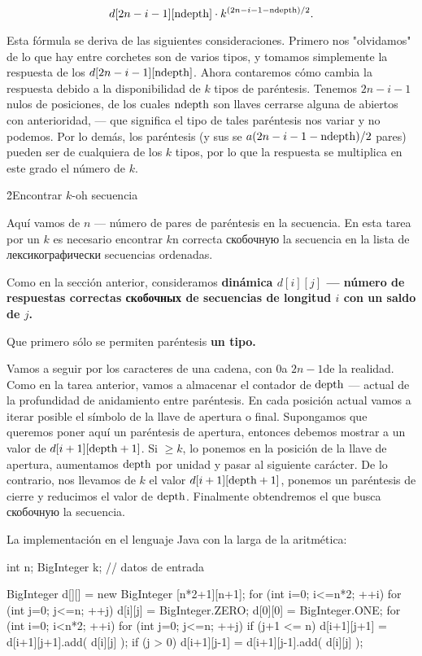 $$ d[2n-i-1][{\rm ndepth}] \cdot k^{ (2n-i-1 - {\rm ndepth})/2 }. $$

Esta fórmula se deriva de las siguientes consideraciones. Primero nos "olvidamos" de lo que hay entre corchetes son de varios tipos, y tomamos simplemente la respuesta de los $d[2n-i-1][{\rm ndepth}]$. Ahora contaremos cómo cambia la respuesta debido a la disponibilidad de $k$ tipos de paréntesis. Tenemos $2n-i-1$ nulos de posiciones, de los cuales $\rm ndepth$ son llaves cerrarse alguna de abiertos con anterioridad, --- que significa el tipo de tales paréntesis nos variar y no podemos. Por lo demás, los paréntesis (y sus se $a(2n-i-1 - {\rm ndepth})/2$ pares) pueden ser de cualquiera de los $k$ tipos, por lo que la respuesta se multiplica en este grado el número de $k$.


\h2{Encontrar $k$-oh secuencia}

Aquí vamos de $n$ --- número de pares de paréntesis en la secuencia. En esta tarea por un $k$ es necesario encontrar $k$n correcta скобочную la secuencia en la lista de лексикографически secuencias ordenadas.

Como en la sección anterior, consideramos \bf{dinámica} $d[i][j]$ --- número de respuestas correctas скобочных de secuencias de longitud $i$ con un saldo de $j$.

Que primero sólo se permiten paréntesis \bf{un} tipo.

Vamos a seguir por los caracteres de una cadena, con $0$a $2n-1$de la realidad. Como en la tarea anterior, vamos a almacenar el contador de $\rm depth$ --- actual de la profundidad de anidamiento entre paréntesis. En cada posición actual vamos a iterar posible el símbolo de la llave de apertura o final. Supongamos que queremos poner aquí un paréntesis de apertura, entonces debemos mostrar a un valor de $d[i+1][\rm depth+1]$. Si $\ge k$, lo ponemos en la posición de la llave de apertura, aumentamos $\rm depth$ por unidad y pasar al siguiente carácter. De lo contrario, nos llevamos de $k$ el valor $d[i+1][\rm depth+1]$, ponemos un paréntesis de cierre y reducimos el valor de $\rm depth$. Finalmente obtendremos el que busca скобочную la secuencia.

La implementación en el lenguaje Java con la larga de la aritmética:

\code
int n; BigInteger k; // datos de entrada

BigInteger d[][] = new BigInteger [n*2+1][n+1];
for (int i=0; i<=n*2; ++i)
for (int j=0; j<=n; ++j)
d[i][j] = BigInteger.ZERO;
d[0][0] = BigInteger.ONE;
for (int i=0; i<n*2; ++i)
for (int j=0; j<=n; ++j) {
if (j+1 <= n)
d[i+1][j+1] = d[i+1][j+1].add( d[i][j] );
if (j > 0)
d[i+1][j-1] = d[i+1][j-1].add( d[i][j] );
}

